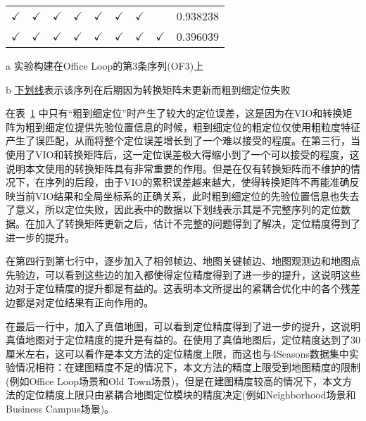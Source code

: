 \begin{table}
\begin{threeparttable}
\begin{tabular}{ccccccccc}
$\checkmark$ & $\checkmark$                                     &$\checkmark$                                                   & $\checkmark$                                    & $\checkmark$                                      & $\checkmark$                                     & $\checkmark$                                      &                                                 & 0.938238       \\
$\checkmark$ & $\checkmark$                                     &$\checkmark$                                                   & $\checkmark$                                    & $\checkmark$                                      & $\checkmark$                                     & $\checkmark$                                      & $\checkmark$                                    & 0.396039       \\ \bottomrule
\end{tabular}
\label{tab:loc_ablation}
\begin{tablenotes}
  \item [a] 实验构建在Office Loop的第3条序列(OF3)上
  \item [b] \underline{下划线}表示该序列在后期因为转换矩阵未更新而粗到细定位失败
\end{tablenotes}
\end{threeparttable}
\end{table}

在表~\ref{tab:loc_ablation} 中只有“粗到细定位”时产生了较大的定位误差，这是因为在VIO和转换矩阵为粗到细定位提供先验位置信息的时候，粗到细定位的粗定位仅使用粗粒度特征产生了误匹配，从而将整个定位误差增长到了一个难以接受的程度。在第三行，当使用了VIO和转换矩阵后，这一定位误差极大得缩小到了一个可以接受的程度，这说明本文使用的转换矩阵具有非常重要的作用。但是在仅有转换矩阵而不维护的情况下，在序列的后段，由于VIO的累积误差越来越大，使得转换矩阵不再能准确反映当前VIO结果和全局坐标系的正确关系，此时粗到细定位的先验位置信息也失去了意义，所以定位失败，因此表中的数据以下划线表示其是不完整序列的定位数据。在加入了转换矩阵更新之后，估计不完整的问题得到了解决，定位精度得到了进一步的提升。

在第四行到第七行中，逐步加入了相邻帧边、地图关键帧边、地图观测边和地图点先验边，可以看到这些边的加入都使得定位精度得到了进一步的提升，这说明这些边对于定位精度的提升都是有益的。这表明本文所提出的紧耦合优化中的各个残差边都是对定位结果有正向作用的。

在最后一行中，加入了真值地图，可以看到定位精度得到了进一步的提升，这说明真值地图对于定位精度的提升是有益的。在使用了真值地图后，定位精度达到了30厘米左右，这可以看作是本文方法的定位精度上限，而这也与4Seasons数据集中实验情况相符：在建图精度不足的情况下，本文方法的精度上限受到地图精度的限制(例如Office Loop场景和Old Town场景)，但是在建图精度较高的情况下，本文方法的定位精度上限只由紧耦合地图定位模块的精度决定(例如Neighborhood场景和Business Campus场景)。

